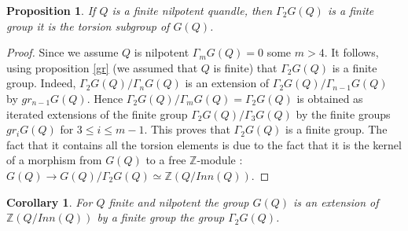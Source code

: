 \documentclass[12pt, reqno]{amsart}
\newtheorem{proposition}[theorem]{Proposition}
\newtheorem{corollary}[theorem]{Corollary}
\newcommand{\Z}{ {\mathbb Z} }
\begin{document}
\begin{proposition}
If $Q$ is a finite nilpotent quandle, then $\Gamma_2G(Q)$ is a finite group it is the torsion subgroup of $G(Q)$.
\end{proposition}
\begin{proof}
Since we assume $Q$ is nilpotent $ \Gamma_mG(Q)=0$ some $m>4$. It follows, using proposition \ref{gr} (we assumed that $Q$ is finite) that $\Gamma_2 G(Q)$ is a finite group. Indeed, $\Gamma_2G(Q)/\Gamma_nG(Q)$ is an extension of $\Gamma_2 G(Q)/ \Gamma_{n-1} G(Q)$ by $gr_{n-1} G(Q)$. Hence $\Gamma_2G(Q)/\Gamma_m G(Q)=\Gamma_2 G(Q)$ is obtained as iterated extensions of the finite group $\Gamma_2 G(Q)/\Gamma_3 G(Q)$ by the finite groups $gr_i G(Q)$ for $3\leq i \leq m-1$. This proves that $\Gamma_2 G(Q)$ is a finite group. The fact that it contains all the torsion elements is due to the fact that it is the kernel of a morphism from $G(Q)$ to a free $\Z$-module : $G(Q)\to G(Q)/\Gamma_2 G(Q) \simeq \Z (Q/Inn(Q))$. 
\end{proof}
\begin{corollary}
For $Q$ finite and nilpotent the group $G(Q)$ is an extension of $\Z(Q/Inn(Q))$ by a finite group the group $\Gamma_2 G(Q)$.
\end{corollary}
\end{document}
